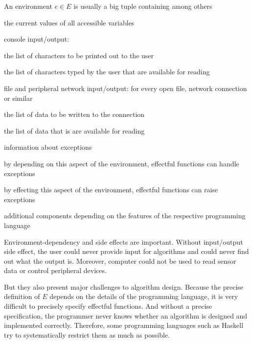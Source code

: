 An environment $e\in E$ is usually a big tuple containing among others
\begin{compactitem}
 \item the current values of all accessible variables
 \item console input/output:
   \begin{compactitem}
      \item the list of characters to be printed out to the user
      \item the list of characters typed by the user that are available for reading
   \end{compactitem}
 \item file and peripheral network input/output: for every open file, network connection or similar
   \begin{compactitem}
      \item the list of data to be written to the connection
      \item the list of data that is are available for reading
   \end{compactitem}
 \item information about exceptions
   \begin{compactitem}
      \item by depending on this aspect of the environment, effectful functions can handle exceptions
      \item by effecting this aspect of the environment, effectful functions can raise exceptions
   \end{compactitem}
 \item additional components depending on the features of the respective programming language
\end{compactitem}

Environment-dependency and side effects are important.
Without input/output side effect, the user could never provide input for algorithms and could never find out what the output is.
Moreover, computer could not be used to read sensor data or control peripheral devices.

But they also present major challenges to algorithm design.
Because the precise definition of $E$ depends on the details of the programming language, it is very difficult to precisely specify effectful functions.
And without a precise specification, the programmer never knows whether an algorithm is designed and implemented correctly.
Therefore, some programming languages such as Haskell try to systematically restrict them as much as possible.
